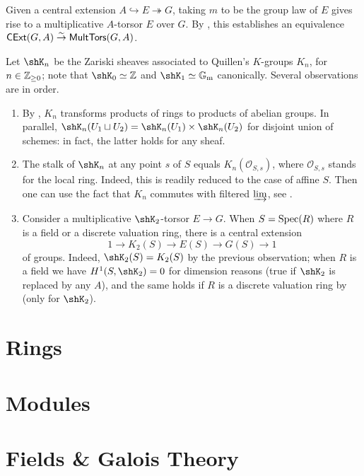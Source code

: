 \documentclass[12pt, a3paper, openany]{book}
\begin{document}
Given a central extension $A \hookrightarrow E \twoheadrightarrow G$, taking $m$ to be the group law of $E$ gives rise to a multiplicative $A$-torsor $E$ over $G$. By \cite[Exp VII, 1.6.6]{SGA7-1}, this establishes an equivalence $\mathsf{CExt}(G,A) \stackrel{\sim}{\rightarrow} \mathsf{MultTors}(G,A)$.

Let $\shK_n$ be the Zariski sheaves associated to Quillen's $K$-groups $K_n$, for $n \in \mathbb{Z}_{\geq 0}$; note that $\shK_0 \simeq \Z$ and $\shK_1 \simeq \Gm$ canonically. Several observations are in order.
\begin{enumerate}
	\item By \cite[IV.6.4]{Wei13}, $K_n$ transforms products of rings to products of abelian groups. In parallel, $\shK_n(U_1 \sqcup U_2) = \shK_n(U_1) \times \shK_n(U_2)$ for disjoint union of schemes: in fact, the latter holds for any sheaf.
	\item The stalk of $\shK_n$ at any point $s$ of $S$ equals $K_n(\mathcal{O}_{S,s})$, where $\mathcal{O}_{S,s}$ stands for the local ring. Indeed, this is readily reduced to the case of affine $S$. Then one can use the fact that $K_n$ commutes with filtered $\varinjlim$, see \cite[IV. 6.4]{Wei13}.
	\item Consider a multiplicative $\shK_2$-torsor $E \to G$. When $S = \operatorname{Spec}(R)$ where $R$ is a field or a discrete valuation ring, there is a central extension
		\[ 1 \to K_2(S) \to E(S) \to G(S) \to 1 \]
		of groups. Indeed, $\shK_2(S) = K_2(S)$ by the previous observation; when $R$ is a field we have $H^1(S, \shK_2)=0$ for dimension reasons (true if $\shK_2$ is replaced by any $A$), and the same holds if $R$ is a discrete valuation ring by \cite[Corollary 3.5]{Weis16} (only for $\shK_2$).
\end{enumerate}

\chapter{Rings}
\chapter{Modules}
\chapter{Fields \& Galois Theory}
\end{document}
